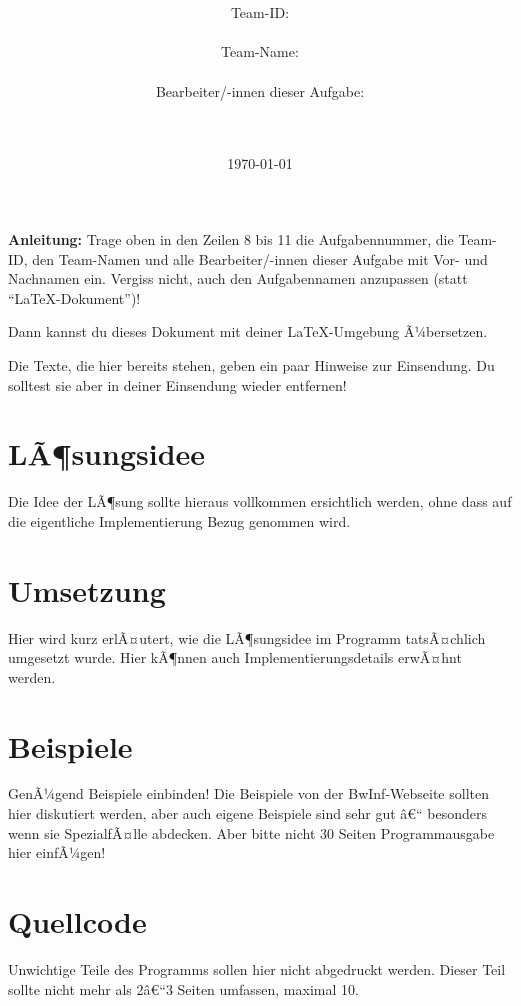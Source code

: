 \documentclass[a4paper,10pt,ngerman]{scrartcl}
\title{\textbf{\Huge\Aufgabe}}
\author{\LARGE Team-ID: \LARGE \TeamId \\\\
	    \LARGE Team-Name: \LARGE \TeamName \\\\
	    \LARGE Bearbeiter/-innen dieser Aufgabe: \\ 
	    \LARGE \Namen\\\\}
\date{\LARGE\today}
\begin{document}
\maketitle
\tableofcontents

\vspace{0.5cm}

\textbf{Anleitung:} Trage oben in den Zeilen 8 bis 11 die Aufgabennummer, die Team-ID, den Team-Namen und alle Bearbeiter/-innen dieser Aufgabe mit Vor- und Nachnamen ein.
Vergiss nicht, auch den Aufgabennamen anzupassen (statt "`\LaTeX-Dokument"')!

Dann kannst du dieses Dokument mit deiner \LaTeX-Umgebung Ã¼bersetzen.

Die Texte, die hier bereits stehen, geben ein paar Hinweise zur
Einsendung. Du solltest sie aber in deiner Einsendung wieder entfernen!

\section{LÃ¶sungsidee}
Die Idee der LÃ¶sung sollte hieraus vollkommen ersichtlich werden, ohne dass auf die eigentliche Implementierung Bezug genommen wird.

\section{Umsetzung}
Hier wird kurz erlÃ¤utert, wie die LÃ¶sungsidee im Programm tatsÃ¤chlich umgesetzt wurde. Hier kÃ¶nnen auch Implementierungsdetails erwÃ¤hnt werden.

\section{Beispiele}
GenÃ¼gend Beispiele einbinden! Die Beispiele von der BwInf-Webseite sollten hier diskutiert werden, aber auch eigene Beispiele sind sehr gut â€“ besonders wenn sie SpezialfÃ¤lle abdecken. Aber bitte nicht 30 Seiten Programmausgabe hier einfÃ¼gen!

\section{Quellcode}
Unwichtige Teile des Programms sollen hier nicht abgedruckt werden. Dieser Teil sollte nicht mehr als 2â€“3 Seiten umfassen, maximal 10.
\end{document}
